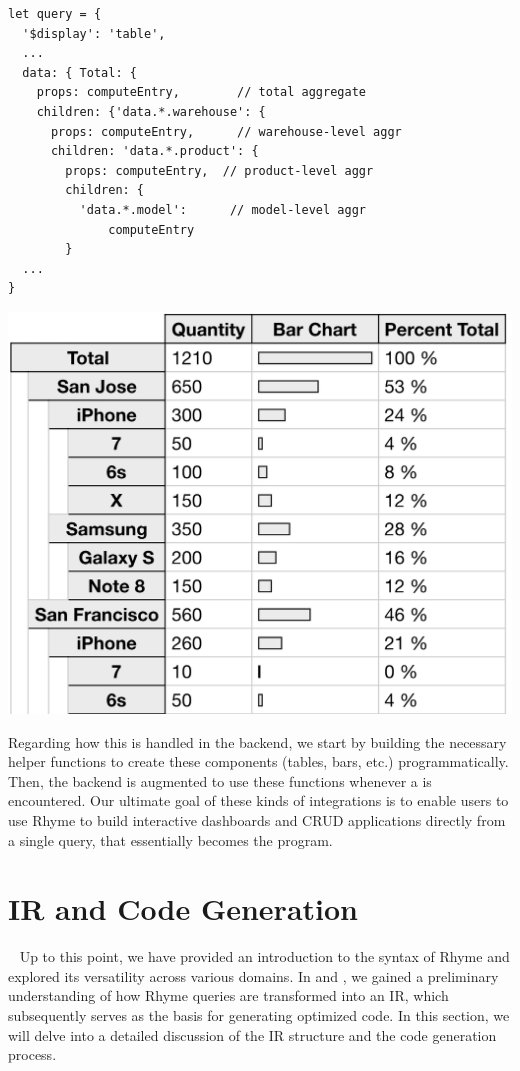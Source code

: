 \documentclass[runningheads]{llncs}
\newcommand{\lang}{Rhyme}
\begin{document}
\hspace{-18pt}
\begin{minipage}{0.6\textwidth}
\begin{lstlisting}[style=JavaScript,columns=flexible]
let query = {
  '$display': 'table',
  ...
  data: { Total: {                    
    props: computeEntry,        // total aggregate           
    children: {'data.*.warehouse': { 
      props: computeEntry,      // warehouse-level aggr
      children: 'data.*.product': {     
        props: computeEntry,  // product-level aggr
        children: {
          'data.*.model':      // model-level aggr
              computeEntry
        }
  ...
}
\end{lstlisting}
\end{minipage}%
\begin{minipage}{0.4\textwidth}
\centering
\includegraphics[width=\textwidth]{images/big_table.png}
\end{minipage}

Regarding how this is handled in the backend, we start by building the necessary helper
functions to create these components (tables, bars, etc.) programmatically.
Then, the backend is augmented to use these functions whenever a 
is encountered.
Our ultimate goal of these kinds of integrations is to enable users
to use \lang{} to build interactive dashboards and CRUD applications 
directly from a single query, that essentially becomes the program.

\vspace{-3mm}
\section{IR and Code Generation}~\label{sec:ir_codegen}
Up to this point, we have provided an introduction to the syntax of
\lang{} and explored its versatility across various domains.
In  and , we gained a preliminary understanding
of how \lang{} queries are transformed into an IR, which subsequently serves
as the basis for generating optimized code.
In this section, we will delve into a detailed discussion of the IR structure
and the code generation process.
\end{document}
